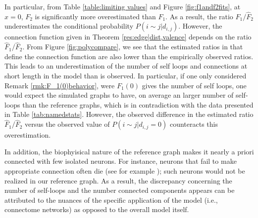 \documentclass[11]{article}
\theoremstyle{remark}
\theoremstyle{definition}
\begin{document}
In particular, from Table \ref{table:limiting values} and Figure \ref{fig:f1andf2fits}, at $x=0$, $F_2$ is significantly more overestimated than $F_1$. As a result, the ratio $\hat F_1/\hat F_2$ underestimates the conditional probability $P(i \sim j | d_{i,j})$. %
However, the connection function given in Theorem \ref{res:edge|dist,valence} depends on the ratio $\hat F_1/\hat F_2$. %
From  Figure \ref{fig:polycompare}, we see that the estimated ratios in that define the connection function are also lower than the empirically observed ratios. %
This leads to an underestimation of the number of self loops and connections at short length in the model than is observed. In particular, if one only considered Remark \ref{rmk:F_1(0)behavior}, were $F_1(0)$ gives the number of self loops, one would expect the simulated graphs to have, on average an larger number of self-loops than the reference graphs, which is in contradiction with the data presented in Table \ref{tab:namedstats}. However, the observed difference in the estimated ratio $\hat F_1/\hat F_2$ versus the observed value of $P(i \sim j | d_{i,j} = 0)$ counteracts this overestimation.

In addition, the biophyisical nature of the reference graph makes it nearly a priori connected with few isolated neurons. For instance, neurons that fail to make appropriate connection often die (see for example \cite{carlson2018human}); such neurons would not be realized in our reference graph. As a result, the discrepancy concerning the number of self-loops and  the number connected components appears can be attributed to the nuances of the specific application of the model (i.e., connectome networks) as opposed to the overall model itself.  




\end{document}
